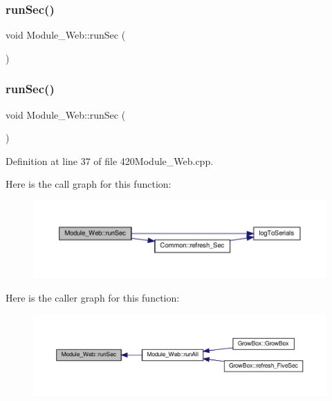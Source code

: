 \subsubsection{\texorpdfstring{run\+Sec()}{runSec()}\hspace{0.1cm}{\footnotesize\ttfamily [1/2]}}
{\footnotesize\ttfamily void Module\+\_\+\+Web\+::run\+Sec (\begin{DoxyParamCaption}{ }\end{DoxyParamCaption})}

\mbox{\label{class_module___web_adec2319a465bb9478e3699ce2d9612db}} 
\subsubsection{\texorpdfstring{run\+Sec()}{runSec()}\hspace{0.1cm}{\footnotesize\ttfamily [2/2]}}
{\footnotesize\ttfamily void Module\+\_\+\+Web\+::run\+Sec (\begin{DoxyParamCaption}{ }\end{DoxyParamCaption})}



Definition at line 37 of file 420\+Module\+\_\+\+Web.\+cpp.

Here is the call graph for this function\+:
\nopagebreak
\begin{figure}[H]
\begin{center}
\leavevmode
\includegraphics[width=350pt]{class_module___web_adec2319a465bb9478e3699ce2d9612db_cgraph}
\end{center}
\end{figure}
Here is the caller graph for this function\+:
\nopagebreak
\begin{figure}[H]
\begin{center}
\leavevmode
\includegraphics[width=350pt]{class_module___web_adec2319a465bb9478e3699ce2d9612db_icgraph}
\end{center}
\end{figure}
\mbox{\label{class_module___web_abd603f024a00f8fd3bfd646ec38d6997}} 
